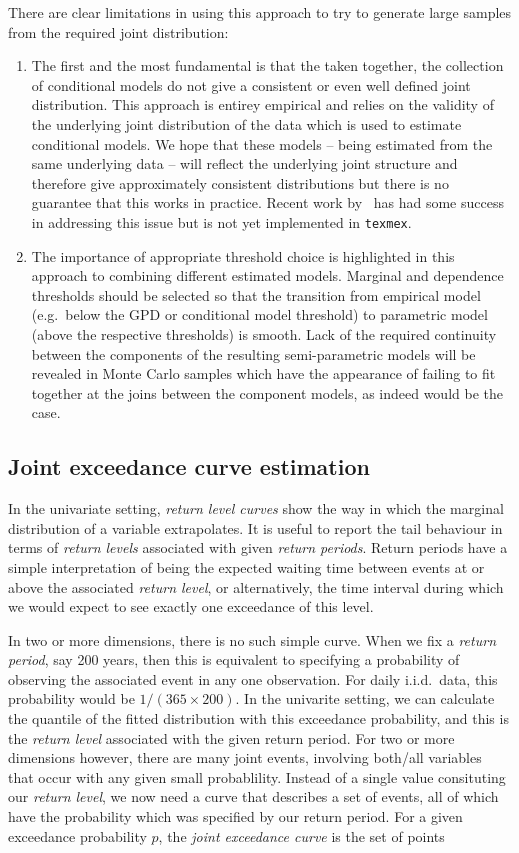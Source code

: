 \documentclass[10pt]{article}\usepackage[]{graphicx}\usepackage[]{color}
\begin{document}
There are clear limitations in using this approach to try to generate large samples from the required joint distribution:
\begin{enumerate}
\item The first and the most fundamental is that the taken together, the collection of conditional models do not give a consistent or even well defined joint distribution.  This approach is entirey empirical and relies on the validity of the underlying joint distribution of the data which is used to estimate conditional models. We hope that these models -- being estimated from the same underlying data -- will reflect the underlying joint structure and therefore give approximately consistent distributions but there is no guarantee that this works in practice.  Recent work by~\cite{ylt} has had some success in addressing this issue but is not yet implemented in {\tt texmex}.
\item The importance of appropriate threshold choice is highlighted in this approach to combining different estimated models.  Marginal and dependence thresholds should be selected so that the transition from empirical model (e.g.\ below the GPD or conditional model threshold) to parametric model (above the respective thresholds) is smooth.  Lack of the required continuity between the components of the resulting semi-parametric models will be revealed in Monte Carlo samples which have the appearance of failing to fit together at the joins between the component models, as indeed would be the case.
\end{enumerate}

\subsection{Joint exceedance curve estimation}
\label{sect:JointExcCurve}
In the univariate setting, {\it return level curves} show the way in which the marginal distribution of a variable extrapolates.  It is useful to report the tail behaviour in terms of {\it return levels} associated with given {\it return periods}.  Return periods have a simple interpretation of being the expected waiting time between events at or above the associated {\it return level}, or alternatively, the time interval during which we would expect to see exactly one exceedance of this level.

In two or more dimensions, there is no such simple curve.  When we  fix a {\it return period}, say 200 years, then this is equivalent to specifying a probability of observing the associated event in any one observation.  For daily i.i.d.\ data, this probability would be $1/(365\times 200)$.  In the univarite setting, we can calculate the quantile of the fitted distribution with this exceedance probability, and this is the {\it return level} associated with the given return period.  For two or more dimensions however, there are many joint events, involving both/all variables that occur with any given small probablility.  Instead of a single value consituting our {\it return level}, we now need a curve that describes a set of events, all of which have the probability which was specified by our return period.  For a given exceedance probability $p$, the {\it joint exceedance curve} is the set of points
\end{document}
